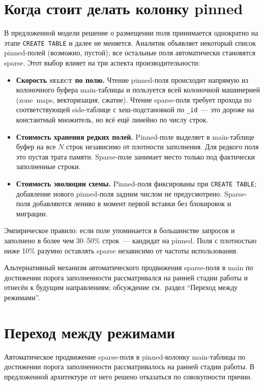 \section{Когда стоит делать колонку pinned}

В предложенной модели решение о размещении поля принимается
однократно на этапе \texttt{CREATE TABLE} и далее не меняется.
Аналитик объявляет некоторый список pinned-полей (возможно, пустой);
все остальные поля автоматически становятся sparse. Этот выбор
влияет на три аспекта производительности:

\begin{itemize}
    \item \textbf{Скорость \textsc{select} по полю.} Чтение
    pinned-поля происходит напрямую из колоночного буфера
    main-таблицы и пользуется всей колоночной машинерией
    (zone~maps, векторизация, сжатие). Чтение sparse-поля
    требует прохода по соответствующей side-таблице с
    хеш-подстановкой по \texttt{\_id}~--- это дороже на
    константный множитель, но всё ещё линейно по числу строк.
    \item \textbf{Стоимость хранения редких полей.} Pinned-поле
    выделяет в main-таблице буфер на все $N$ строк независимо от
    плотности заполнения. Для редкого поля это пустая трата
    памяти. Sparse-поле занимает место только под фактически
    заполненные строки.
    \item \textbf{Стоимость эволюции схемы.} Pinned-поля
    фиксированы при \texttt{CREATE TABLE}; добавление нового
    pinned-поля задним числом не предусмотрено. Sparse-поля
    добавляются лениво в момент первой вставки без блокировок и
    миграции.
\end{itemize}

Эмпирическое правило: если поле упоминается в большинстве запросов
и заполнено в более чем 30--50\% строк~--- кандидат на pinned. Поля
с плотностью ниже 10\% разумно оставлять sparse независимо от
частоты использования.

Альтернативный механизм автоматического продвижения sparse-поля в
main по достижении порога заполненности рассматривался на ранней
стадии работы и отнесён к будущим направлениям; обсуждение
см.~раздел ``Переход между режимами''.

\section{Переход между режимами}

Автоматическое продвижение sparse-поля в pinned-колонку
main-таблицы по достижении порога заполненности рассматривалось на
ранней стадии работы. В предложенной архитектуре от него решено
отказаться по совокупности причин.

